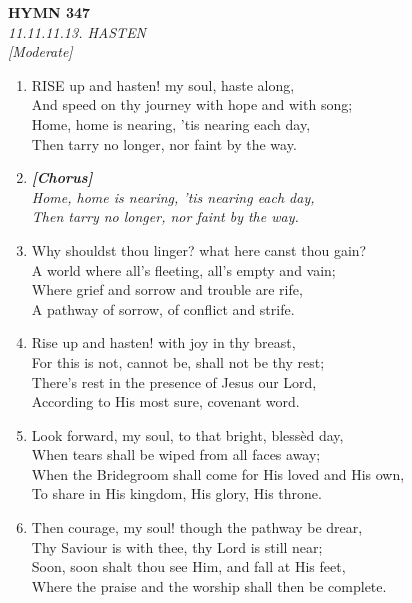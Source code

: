 \newpage
\begin{center}
    {\Large \textbf{HYMN 347}}
    \\
    \textit{11.11.11.13. HASTEN}
    \\
    \textit{\small [Moderate]}
\end{center}
\vspace{1em}

\begin{enumerate}
    \item RISE up and hasten! my soul, haste along, \\
        And speed on thy journey with hope and with song; \\
        Home, home is nearing, 'tis nearing each day, \\
        Then tarry no longer, nor faint by the way.

    \item[] \vspace{0.4em}
    \textbf{\textit{[Chorus]}} \\
    \textit{Home, home is nearing, 'tis nearing each day,} \\
    \textit{Then tarry no longer, nor faint by the way.}
    \vspace{0.4em}

    \item Why shouldst thou linger? what here canst thou gain? \\
        A world where all's fleeting, all's empty and vain; \\
        Where grief and sorrow and trouble are rife, \\
        A pathway of sorrow, of conflict and strife.

    \item Rise up and hasten! with joy in thy breast, \\
        For this is not, cannot be, shall not be thy rest; \\
        There's rest in the presence of Jesus our Lord, \\
        According to His most sure, covenant word.

    \item Look forward, my soul, to that bright, bless\`ed day, \\
        When tears shall be wiped from all faces away; \\
        When the Bridegroom shall come for His loved and His own, \\
        To share in His kingdom, His glory, His throne.

    \item Then courage, my soul! though the pathway be drear, \\
        Thy Saviour is with thee, thy Lord is still near; \\
        Soon, soon shalt thou see Him, and fall at His feet, \\
        Where the praise and the worship shall then be complete.

\end{enumerate}
